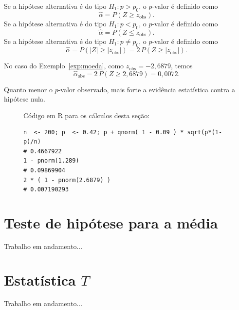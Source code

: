 \documentclass[12pt,a4paper]{article}
\theoremstyle{plain}
\theoremstyle{definition}
\theoremstyle{remark}
\begin{document}
Se a hipótese alternativa é do tipo $H_1:p>p_0$, o $p$-valor é definido como
\[
\hat{\alpha}
=
P(Z \geq z_{\mathrm{obs}})
.
\]
Se a hipótese alternativa é do tipo $H_1:p < p_0$, o $p$-valor é definido como
\[
\hat{\alpha}
=
P(Z \leq z_{\mathrm{obs}})
.
\]
Se a hipótese alternativa é do tipo $H_1:p \ne p_0$, o $p$-valor é definido como
\[
\hat{\alpha}
=
P(|Z| \geq |z_{\mathrm{obs}}|)
=
2\, P(Z \geq |z_{\mathrm{obs}}|)
.
\]

No caso do Exemplo~\ref{exp:moeda}, como $z_{\mathrm{obs}}=-2,6879$, temos
\[
\hat{\alpha}_{\mathrm{obs}}
=
2\, P(Z \geq 2,6879)
=
0,0072
.
\]

Quanto menor o $p$-valor observado, mais forte a evidência estatística contra a hipótese nula.

\begin{figure}[H]
Código em R para os cálculos desta seção:
\footnotesize
\begin{verbatim}
n  <- 200; p  <- 0.42; p + qnorm( 1 - 0.09 ) * sqrt(p*(1-p)/n)
# 0.4667922
1 - pnorm(1.289)
# 0.09869904
2 * ( 1 - pnorm(2.6879) )
# 0.007190293
\end{verbatim}
\end{figure}


\section{Teste de hipótese para a média}

Trabalho em andamento...


\section{Estatística $T$}

Trabalho em andamento...
\end{document}
